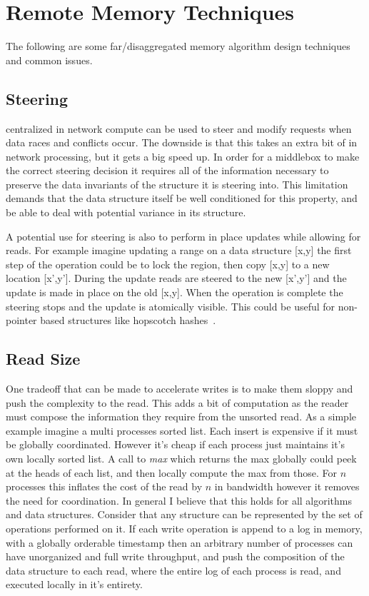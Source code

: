 \section{Remote Memory Techniques}
\label{sec:techniques}

The following are some far/disaggregated memory algorithm design techniques and
common issues.

\subsection{Steering} 
\label{sec:steering}
%
centralized in network compute can be used to steer and modify
requests when data races and conflicts occur. The downside is that this takes an
extra bit of in network processing, but it gets a big speed up. In order for a
middlebox to make the correct steering decision it requires all of the
information necessary to preserve the data invariants of the structure it is
steering into. This limitation demands that the data structure itself be well
conditioned for this property, and be able to deal with potential variance in
its structure.

A potential use for steering is also to perform in place updates while allowing
for reads. For example imagine updating a range on a data structure [x,y] the
first step of the operation could be to lock the region, then copy [x,y] to a
new location [x',y']. During the update reads are steered to the new [x',y'] and
the update is made in place on the old [x,y]. When the operation is complete the
steering stops and the update is atomically visible. This could be useful for
non-pointer based structures like hopscotch hashes~\cite{hopscotch}.

\subsection{Read Size} 
\label{sec:readsize}
One tradeoff that can be made to accelerate writes is to make
them sloppy and push the complexity to the read. This adds a bit of computation
as the reader must compose the information they require from the unsorted read.
As a simple example imagine a multi processes sorted list. Each insert is
expensive if it must be globally coordinated. However it's cheap if each process
just maintains it's own locally sorted list. A call to \textit{max} which
returns the max globally could peek at the heads of each list, and then locally
compute the max from those. For $n$ processes this inflates the cost of the read
by $n$ in bandwidth however it removes the need for coordination. In general I
believe that this holds for all algorithms and data structures. Consider that any
structure can be represented by the set of operations performed on it. If each
write operation is append to a log in memory, with a globally orderable
timestamp then an arbitrary number of processes can have unorganized and full
write throughput, and push the composition of the data structure to each read,
where the entire log of each process is read, and executed locally in it's
entirety.

